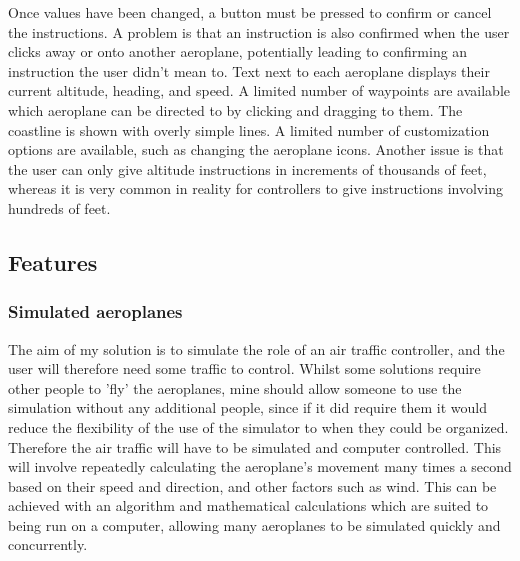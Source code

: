 \documentclass{article}
\begin{document}
Once values have been changed, a button must be pressed to confirm or cancel the instructions.
A problem is that an instruction is also confirmed when the user clicks away or onto another aeroplane, potentially leading to confirming an instruction the user didn't mean to.
Text next to each aeroplane displays their current altitude, heading, and speed.
A limited number of waypoints are available which aeroplane can be directed to by clicking and dragging to them.
The coastline is shown with overly simple lines.
A limited number of customization options are available, such as changing the aeroplane icons.
Another issue is that the user can only give altitude instructions in increments of thousands of feet, whereas it is very common in reality for controllers to give instructions involving hundreds of feet.


\subsection{Features} \label{essentialfeatures}
\subsubsection{Simulated aeroplanes}
The aim of my solution is to simulate the role of an air traffic controller, and the user will therefore need some traffic to control.
Whilst some solutions require other people to 'fly' the aeroplanes, mine should allow someone to use the simulation without any additional people, since if it did require them it would reduce the flexibility of the use of the simulator to when they could be organized.
Therefore the air traffic will have to be simulated and computer controlled.
This will involve repeatedly calculating the aeroplane's movement many times a second based on their speed and direction, and other factors such as wind.
This can be achieved with an algorithm and mathematical calculations which are suited to being run on a computer, allowing many aeroplanes to be simulated quickly and concurrently.
\end{document}
